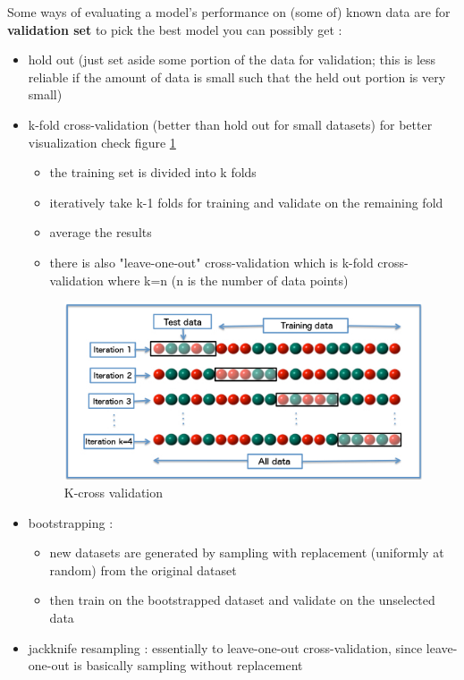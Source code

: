 Some ways of evaluating a model's performance on (some of)  known data are for \textbf{validation set } to pick  the best model you can possibly get :

\begin{itemize}
\item hold out (just set aside some portion of the data for validation; this is less reliable if the amount of data is small such that the held out portion is very small) 
\item k-fold cross-validation (better than hold out for small datasets) for better visualization  check figure \ref{fig:cross}
\begin{itemize}
\item the training set is divided into k folds
\item iteratively take k-1 folds for training and validate on the remaining fold
\item average the results
\item there is also "leave-one-out" cross-validation which is k-fold cross-validation where k=n (n is the number of data points)
\end{itemize}

\begin{figure}[H]
\centering
\includegraphics[width=1.0\textwidth]{img/cross.jpg}
\caption{K-cross validation }
\label{fig:cross}
\end{figure}


\item bootstrapping : 
\begin{itemize}
\item new datasets are generated by sampling with replacement (uniformly at random) from the original dataset
\item then train on the bootstrapped dataset and validate on the unselected data
\end{itemize}
\item jackknife resampling : 
essentially to leave-one-out cross-validation, since leave-one-out is basically sampling without replacement
\end{itemize}


